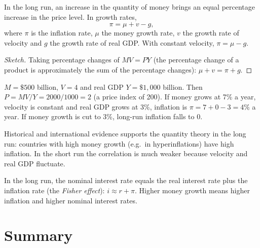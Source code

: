 \begin{theorem}
In the long run, an increase in the quantity of money brings an equal percentage increase
in the price level. In growth rates,
\[
  \pi = \mu + v - g,
\]
where $\pi$ is the inflation rate, $\mu$ the money growth rate, $v$ the growth rate of
velocity and $g$ the growth rate of real GDP. With constant velocity,
$\pi = \mu - g$.
\end{theorem}

\begin{proof}[Sketch]
Taking percentage changes of $MV = PY$ (the percentage change of a product is
approximately the sum of the percentage changes): $\mu + v = \pi + g$.
\end{proof}

\begin{example}
$M = \$500$ billion, $V = 4$ and real GDP $Y = \$1{,}000$ billion. Then
$P = MV/Y = 2000/1000 = 2$ (a price index of 200). If money grows at 7\% a year, velocity is
constant and real GDP grows at 3\%, inflation is $\pi = 7 + 0 - 3 = 4\%$ a year.
If money growth is cut to 3\%, long-run inflation falls to 0.
\end{example}

Historical and international evidence supports the quantity theory in the long run:
countries with high money growth (e.g.\ in hyperinflations) have high inflation. In the
short run the correlation is much weaker because velocity and real GDP fluctuate.

\begin{remark}
In the long run, the nominal interest rate equals the real interest rate plus the
inflation rate (the \emph{Fisher effect}): $i \approx r + \pi$. Higher money growth means
higher inflation and higher nominal interest rates.
\end{remark}

\section{Summary}


